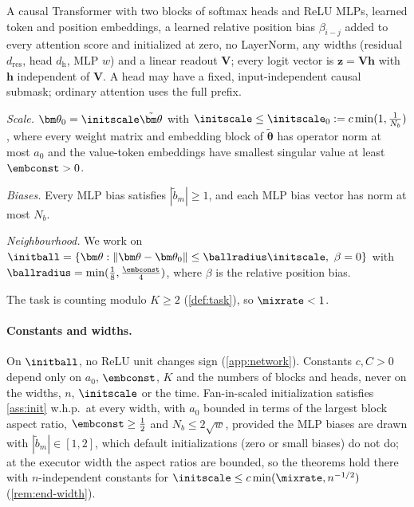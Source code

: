\begin{assumption}[Architecture]
\label{ass:arch}
A causal Transformer with two blocks of softmax heads and ReLU MLPs, learned token and position
embeddings, a learned relative position bias $\beta_{i-j}$ added to every attention score and initialized at zero, no
LayerNorm, any widths (residual $d_{\mathrm{res}}$, head $d_{\mathrm h}$, MLP $w$) and a linear readout $\mathbf V$;
every logit vector is $\bm z=\mathbf V\bm h$ with $\bm h$ independent of $\mathbf V$. A head may have a fixed, input-independent causal submask;
ordinary attention uses the full prefix.
\end{assumption}

\begin{assumption}[Initialization]
\label{ass:init}
\emph{Scale.} $\bm\theta_0=\initscale\tilde{\bm\theta}$ with $\initscale\le\initscale_0:=c\min(1,\frac{1}{N_b})$, where every weight matrix and embedding block of $\tilde{\bm\theta}$ has operator norm
at most $a_0$ and the value-token embeddings have smallest singular value at least $\embconst>0$.

\emph{Biases.} Every MLP bias satisfies $|\tilde b_m|\ge1$, and each MLP bias vector has norm at most $N_b$.

\emph{Neighbourhood.} We work on
$\initball=\{\bm\theta:\|\bm\theta-\bm\theta_0\|\le\ballradius\initscale,\ \beta=0\}$ with $\ballradius=\min(\frac{1}{8},\frac{\embconst}{4})$, where $\beta$ is the
relative position bias.
\end{assumption}

\begin{assumption}[Task]
\label{ass:task}
The task is counting modulo $K\ge2$ (\cref{def:task}), so $\mixrate<1$.
\end{assumption}

\paragraph{Constants and widths.} On $\initball$, no ReLU unit changes sign (\cref{app:network}). Constants $c,C>0$ depend only on $a_0$, $\embconst$, $K$
and the numbers of blocks and heads, never on the widths, $n$, $\initscale$ or the time. Fan-in-scaled initialization
satisfies \cref{ass:init} w.h.p.\ at every width, with $a_0$ bounded in terms of the largest block aspect ratio,
$\embconst\ge\tfrac{1}{2}$ and $N_b\le2\sqrt w$, provided the MLP biases are drawn with $|\tilde b_m|\in[1,2]$, which default
initializations (zero or small biases) do not do; at the executor width the aspect ratios are bounded, so the theorems
hold there with $n$-independent constants for $\initscale\le c\min(\mixrate,n^{-1/2})$ (\cref{rem:end-width}).

